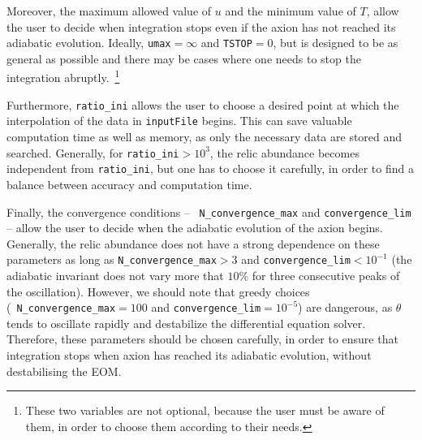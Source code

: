 \documentclass[11pt,a4paper]{article}
\begin{document}
Moreover,  the maximum allowed value of $u$ and the minimum value of $T$, allow the user to decide when  integration stops even if the axion has not reached its adiabatic evolution. Ideally, {\tt umax}$=\infty$ and {\tt TSTOP}$=0$, but \mimes is designed to be as general as possible and there may be cases where one needs to stop the integration abruptly.~\footnote{These two variables are not optional, because the user must be aware of them, in order to choose them according to their needs.}

Furthermore, {\tt ratio\_ini} allows the user to choose a desired point at which the interpolation of the data in {\tt inputFile} begins. This can save valuable computation time as well as memory, as only the necessary data are stored and searched. Generally, for {\tt ratio\_ini}$>10^{3}$, the relic abundance becomes
independent from  {\tt ratio\_ini}, but one has to choose it carefully, in order to find a balance between accuracy and computation time.

Finally, the convergence conditions -- \ie~{\tt N\_convergence\_max} and {\tt convergence\_lim} -- allow the user to decide when the adiabatic evolution of the axion begins. Generally, the relic abundance does not have a strong dependence on these parameters as long as {\tt N\_convergence\_max}$>3$ and {\tt convergence\_lim}$<10^{-1}$ (\ie the adiabatic invariant does not vary more that $10\%$ for three consecutive peaks of the oscillation). 
%
However, we should note that greedy choices (\eg~{\tt N\_convergence\_max}$=100$ and {\tt convergence\_lim}$=10^{-5}$) are dangerous, as $\theta$ tends to oscillate rapidly and destabilize the differential equation solver. Therefore, these parameters should be chosen carefully, in order to ensure that integration stops when axion has reached its adiabatic evolution, without destabilising the EOM.
\end{document}
